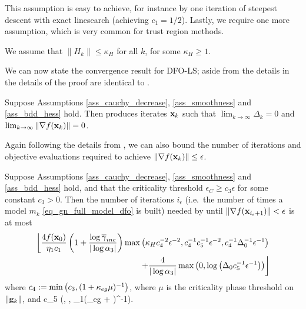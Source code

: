 This assumption is easy to achieve, for instance by one iteration of steepest descent with exact linesearch (achieving $c_1=1/2$).
Lastly, we require one more assumption, which is very common for trust region methods.

\begin{assumption} \label{ass_bdd_hess}
	We assume that $\|H_k\|\leq\kappa_H$ for all $k$, for some $\kappa_H\geq1$.
\end{assumption}

We can now state the convergence result for DFO-LS; aside from the details in  the details of the proof are identical to \cite{Cartis2017a}.

\begin{theorem} \label{thm_lim}
	Suppose Assumptions \ref{ass_cauchy_decrease}, \ref{ass_smoothness} and \ref{ass_bdd_hess} hold.
	Then  produces iterates $\mathbf{x}_k$ such that $\lim_{k\to\infty}\Delta_k=0$ and
	$\lim_{k\to\infty}\|\nabla f(\mathbf{x}_k)\|=0$.
\end{theorem}

Again following the details from \cite{Cartis2017a}, we can also bound the number of iterations and objective evaluations required to achieve $\|\nabla f(\mathbf{x}_k)\|\leq \epsilon$. 

\begin{theorem} \label{thm_iters_bound}
	Suppose Assumptions \ref{ass_cauchy_decrease}, \ref{ass_smoothness} and \ref{ass_bdd_hess} hold, and that the criticality threshold $\epsilon_C \geq c_3\epsilon$ for some constant $c_3>0$.
	Then the number of iterations  $i_{\epsilon}$ (i.e.~the number of times a model $m_k$ \eqref{eq_gn_full_model_dfo} is built) needed by  until $\|\nabla f(\mathbf{x}_{i_{\epsilon}+1})\|< \epsilon$ is at most
	\begin{align}
		\left\lfloor\frac{4f(\mathbf{x}_0)}{\eta_1 c_1}\left(1 + \frac{\log \overline{\gamma}_{inc}}{|\log \alpha_3|}\right)\max\left(\kappa_H c_4^{-2}\epsilon^{-2}, c_4^{-1}c_5^{-1}\epsilon^{-2}, c_4^{-1}\Delta_0^{-1}\epsilon^{-1}\right)\right. \nonumber \\
\left.\quad + \frac{4}{|\log \alpha_3|}\max\left(0,\log \left(\Delta_0 c_5^{-1} \epsilon^{-1}\right)\right)\right\rfloor \label{eq_num_iters}
	\end{align}
	where $c_4 := \min\left(c_3, (1 + \kappa_{eg}\mu)^{-1}\right)$, where $\mu$ is the criticality phase threshold on $\|\mathbf{g}_k\|$, and
	\be c_5  \min\left(, , \alpha_1\left(\kappa_{eg} + \right)^{-1}\right). \ee
\end{theorem}


